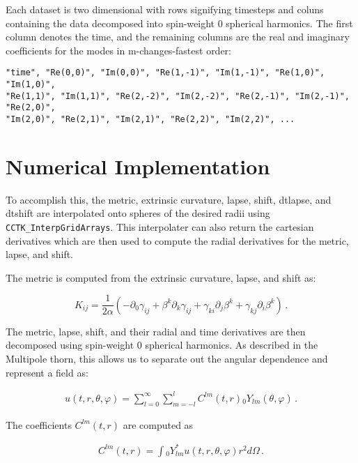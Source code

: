 \documentclass{article}
\begin{document}
Each dataset is two dimensional with rows signifying timesteps and coluns containing the data decomposed into spin-weight 0
spherical harmonics. The first column denotes the time, and the remaining columns are the real and imaginary coefficients 
for the modes in m-changes-fastest order:

\begin{verbatim}
"time", "Re(0,0)", "Im(0,0)", "Re(1,-1)", "Im(1,-1)", "Re(1,0)", "Im(1,0)",
"Re(1,1)", "Im(1,1)", "Re(2,-2)", "Im(2,-2)", "Re(2,-1)", "Im(2,-1)", "Re(2,0)",
"Im(2,0)", "Re(2,1)", "Im(2,1)", "Re(2,2)", "Im(2,2)", ...
\end{verbatim}

\section{Numerical Implementation}

To accomplish this, the metric, extrinsic curvature, lapse, shift, dtlapse, and dtshift are interpolated onto spheres
of the desired radii using \texttt{CCTK_InterpGridArrays}. This interpolater can also return the cartesian derivatives
which are then used to compute the radial derivatives for the metric, lapse, and shift.

The metric is computed from the extrinsic curvature, lapse, and shift as:

\begin{equation}
K_{ij} = \frac{1}{2 \alpha} \left ( -\partial_0 \gamma_{ij} + \beta^k \partial_k \gamma_{ij} + \gamma_{ki} \partial_j \beta^k + \gamma_{kj} \partial_i \beta^k \right ) \, .
\end{equation}

The metric, lapse, shift, and their radial and time derivatives are then decomposed using spin-weight 0 spherical harmonics.
As described in the Multipole thorn, this allows us to separate out the angular dependence and represent a field as:

\begin{eqnarray}
    u(t, r, \theta, \varphi) = \sum_{l=0}^\infty \sum_{m=-l}^l C^{lm}(t,r) {}_0 Y_{lm}(\theta,\varphi) \, .
\end{eqnarray}
  
The coefficients $C^{lm}(t,r)$ are computed as
  
\begin{eqnarray}
    C^{lm}(t, r) = \int {}_0 Y_{lm}^* u(t, r, \theta, \varphi) r^2 d \Omega \label{eqn:clmint} \, .
\end{eqnarray}
\end{document}
